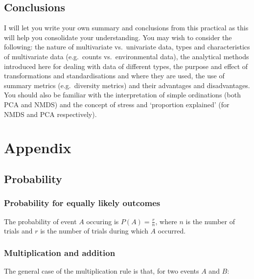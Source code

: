 \documentclass[
  11pt,
  a4paper,
]{book}
\begin{document}
\hypertarget{conclusions-5}{%
\section{Conclusions}\label{conclusions-5}}

I will let you write your own summary and conclusions from this practical as this will help you consolidate your understanding. You may wish to consider the following: the nature of multivariate vs.~univariate data, types and characteristics of multivariate data (e.g.~counts vs.~environmental data), the analytical methods introduced here for dealing with data of different types, the purpose and effect of transformations and standardisations and where they are used, the use of summary metrics (e.g.~diversity metrics) and their advantages and disadvantages. You should also be familiar with the interpretation of simple ordinations (both PCA and NMDS) and the concept of stress and `proportion explained' (for NMDS and PCA respectively).

\hypertarget{appendix}{%
\chapter{Appendix}\label{appendix}}

\hypertarget{probability}{%
\section{Probability}\label{probability}}

\hypertarget{probability-for-equally-likely-outcomes}{%
\subsection{Probability for equally likely outcomes}\label{probability-for-equally-likely-outcomes}}

The probability of event \(A\) occuring is \(P(A) = \frac{r}{n}\), where \(n\) is the number of trials and \(r\) is the number of trials during which \(A\) occurred.

\hypertarget{multiplication-and-addition}{%
\subsection{Multiplication and addition}\label{multiplication-and-addition}}

The general case of the multiplication rule is that, for two events \(A\) and \(B\):
\end{document}
